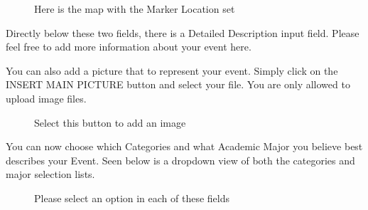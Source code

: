 \documentclass[10pt]{article}
\begin{document}
			
			\begin{figure}[H]
				\centering
				\caption{Here is the map with the Marker Location set}
				\label{fig:awesome_image}
			\end{figure}
			
			Directly below these two fields, there is a Detailed Description input field. Please feel free to add more information about your event here.\\
			
			\par You can also add a picture that to represent your event. Simply click on the INSERT MAIN PICTURE button and select your file. You are only allowed to upload image files.

			\begin{figure}[H]
				\centering
				\caption{Select this button to add an image}
				\label{fig:awesome_image}
			\end{figure}
			
			You can now choose which Categories and what Academic Major you believe best describes your Event. Seen below is a dropdown view of both the categories and major selection lists.
			
			 \begin{figure}[H]
			 	\centering
			 	\caption{Please select an option in each of these fields}
			 	\label{fig:awesome_image}
			 \end{figure}
			 
\end{document}
